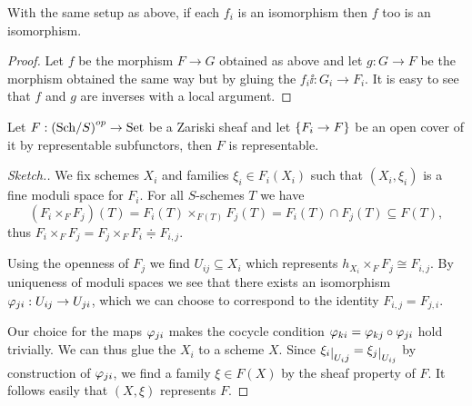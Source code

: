 \begin{corollary}\label{IsomorphismGluingForZariskiSheaves}
With the same setup as above, if each $f_i$ is an isomorphism then $f$ too is an isomorphism.
\end{corollary}
\begin{proof}
Let $f$ be the morphism $F\to G$ obtained as above and let $g:G\to F$ be the morphism obtained the same way but by gluing the $f_i\ii:G_i\to F_i$. It is easy to see that $f$ and $g$ are inverses with a local argument.
\end{proof}


\begin{theorem}\label{RepresentabilityByOpenSubfunctorCover}
Let $F:\left({\mathrm{Sch}}/{S}\right)^{op}\to \mathrm{Set}$ be a Zariski sheaf and let $\left\{{F_i\to F}\right\}$ be an open cover of it by representable subfunctors, then $F$ is representable.
\end{theorem}
\begin{proof}[Sketch.]
We fix schemes $X_i$ and families $\xi_i\in F_i(X_i)$ such that $(X_i,\xi_i)$ is a fine moduli space for $F_i$. For all $S$-schemes $T$ we have
\[(F_i\times_F F_j)(T)=F_i(T)\times_{F(T)}F_j(T)=F_i(T)\cap F_j(T)\subseteq F(T),\]
thus $F_i\times_F F_j=F_j\times_F F_i\doteqdot F_{i,j}$. 

Using the openness of $F_j$ we find $U_{ij}\subseteq X_i$ which represents $h_{X_i}\times_FF_j\cong F_{i,j}$. By uniqueness of moduli spaces we see that there exists an isomorphism $\varphi_{ji}:U_{ij}\to U_{ji}$, which we can choose to correspond to the identity $F_{i,j}= F_{j,i}$.

Our choice for the maps $\varphi_{ji}$ makes the cocycle condition $\varphi_{ki}=\varphi_{kj}\circ \varphi_{ji}$ hold trivially. We can thus glue the $X_i$ to a scheme $X$. Since $\xi_i\res{U_ij}=\xi_j\res{U_{ij}}$ by construction of $\varphi_{ji}$, we find a family $\xi\in F(X)$ by the sheaf property of $F$. It follows easily that $(X,\xi)$ represents $F$.
\end{proof}

